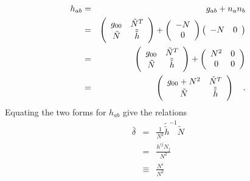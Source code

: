 \documentclass[twocolumn]{article}
\def\.{{\quad .}}
\begin{document}
\begin{eqnarray*}
   h_{ab} & = &  g_{ab} + n_{a}n_{b}  \\
             & = & \left(
                      \begin{array}{cc}
                         g_{00}   & {\tilde N}^T \\
                         \tilde N & {\tilde {\tilde h}}
                      \end{array}
                   \right) +
                   \left(
                      \begin{array}{c}
                         -N \\
                          0
                      \end{array}
                   \right)
                   \left(
                      \begin{array}{c c}
                         -N & 0
                      \end{array}
                   \right)\\
             & = & \left(
                      \begin{array}{cc}
                         g_{00}   & {\tilde N}^T \\
                         \tilde N & {\tilde {\tilde h}}
                      \end{array}
                   \right) +
                   \left(
                      \begin{array}{cc}
                         N^2 & 0 \\
                         0   & 0
                      \end{array}
                   \right) \\
             & = & \left(
                      \begin{array}{cc}
                         g_{00} + N^2  & {\tilde N}^T \\
                         \tilde N & {\tilde {\tilde h}}
                      \end{array}
                   \right) \.
\end{eqnarray*}
Equating the two forms for $h_{a b}$ give the relations
\begin{eqnarray*}
   \bar \delta & = & \frac{1}{N^2} {\tilde {\tilde h}}^{-1} {\tilde N} \\
               & = & \frac{h^{ij} N_j}{N^2} \\
               & \equiv & \frac{N^i}{N^2}
\end{eqnarray*}
\end{document}
